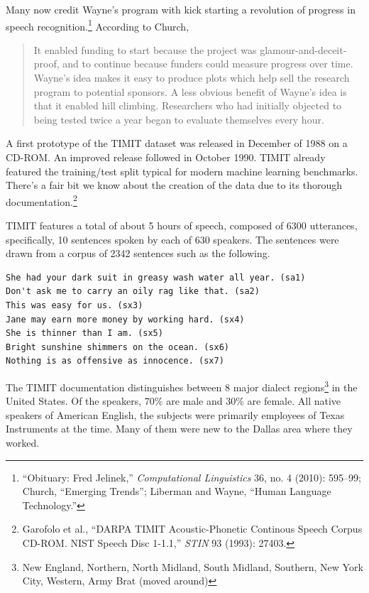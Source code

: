 \documentclass{tufte-book}
\begin{document}
Many now credit Wayne's program with kick starting a revolution of
progress in speech recognition.\footnote{{``Obituary: {F}red
  {J}elinek,''} \emph{Computational Linguistics} 36, no. 4 (2010):
  595--99; Church, {``Emerging Trends''}; Liberman and Wayne, {``Human
  Language Technology.''}} According to Church,

\begin{quote}
It enabled funding to start because the project was
glamour-and-deceit-proof, and to continue because funders could measure
progress over time. Wayne's idea makes it easy to produce plots which
help sell the research program to potential sponsors. A less obvious
benefit of Wayne's idea is that it enabled hill climbing. Researchers
who had initially objected to being tested twice a year began to
evaluate themselves every hour.
\end{quote}

A first prototype of the TIMIT dataset was released in December of 1988
on a CD-ROM. An improved release followed in October 1990. TIMIT already
featured the training/test split typical for modern machine learning
benchmarks. There's a fair bit we know about the creation of the data
due to its thorough documentation.\footnote{Garofolo et al., {``DARPA
  {TIMIT} Acoustic-Phonetic Continous Speech Corpus {CD-ROM}. {NIST}
  Speech Disc 1-1.1,''} \emph{STIN} 93 (1993): 27403.}

TIMIT features a total of about 5 hours of speech, composed of 6300
utterances, specifically, 10 sentences spoken by each of 630 speakers.
The sentences were drawn from a corpus of 2342 sentences such as the
following.

\begin{verbatim}
She had your dark suit in greasy wash water all year. (sa1)
Don't ask me to carry an oily rag like that. (sa2)
This was easy for us. (sx3)
Jane may earn more money by working hard. (sx4)
She is thinner than I am. (sx5)
Bright sunshine shimmers on the ocean. (sx6)
Nothing is as offensive as innocence. (sx7)
\end{verbatim}

The TIMIT documentation distinguishes between 8 major dialect
regions\footnote{New England, Northern, North Midland, South Midland,
  Southern, New York City, Western, Army Brat (moved around)} in the
United States. Of the speakers, 70\% are male and 30\% are female. All
native speakers of American English, the subjects were primarily
employees of Texas Instruments at the time. Many of them were new to the
Dallas area where they worked.
\end{document}
